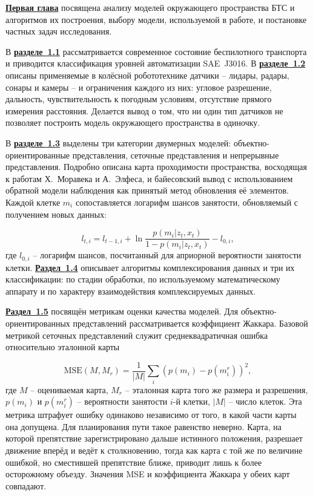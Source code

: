 \underline{\textbf{Первая глава}} посвящена анализу моделей окружающего пространства БТС и алгоритмов их построения, выбору модели, используемой в работе, и постановке частных задач исследования.

В \underline{\textbf{разделе~1.1}} рассматривается современное состояние беспилотного транспорта и приводится классификация уровней автоматизации SAE~J3016. В \underline{\textbf{разделе~1.2}} описаны применяемые в колёсной робототехнике датчики -- лидары, радары, сонары и камеры -- и ограничения каждого из них: угловое разрешение, дальность, чувствительность к погодным условиям, отсутствие прямого измерения расстояния. Делается вывод о том, что ни один тип датчиков не позволяет построить модель окружающего пространства в одиночку.

В \underline{\textbf{разделе~1.3}} выделены три категории двумерных моделей: объектно-ориентированные представления, сеточные представления и непрерывные представления. Подробно описана карта проходимости пространства, восходящая к работам Х.~Моравека и А.~Элфеса, и байесовский вывод с использованием обратной модели наблюдения как принятый метод обновления её элементов. Каждой клетке $m_i$ сопоставляется логарифм шансов занятости, обновляемый с получением новых данных:

\begin{equation}
	l_{t,i} = l_{t-1,i} + \ln\dfrac{p(m_i|z_t, x_t)}{1 - p(m_i|z_t, x_t)} - l_{0,i},
	\label{eq:syn_log_odd_upd}
\end{equation}
где $l_{0,i}$ -- логарифм шансов, посчитанный для априорной вероятности занятости клетки. \underline{\textbf{Раздел~1.4}} описывает алгоритмы комплексирования данных и три их классификации: по стадии обработки, по используемому математическому аппарату и по характеру взаимодействия комплексируемых данных.

\underline{\textbf{Раздел~1.5}} посвящён метрикам оценки качества моделей. Для объектно-ориентированных представлений рассматривается коэффициент Жаккара. Базовой метрикой сеточных представлений служит среднеквадратичная ошибка относительно эталонной карты

\begin{equation}
	\text{MSE}(M, M_r) = \dfrac{1}{|M|}\sum_{i}\left(p(m_i) - p(m_i^r)\right)^2,
	\label{eq:syn_map_mse}
\end{equation}
где $M$ -- оцениваемая карта, $M_r$ -- эталонная карта того же размера и разрешения, $p(m_i)$ и $p(m_i^r)$ -- вероятности занятости $i$-й клетки, $|M|$ -- число клеток. Эта метрика штрафует ошибку одинаково независимо от того, в какой части карты она допущена. Для планирования пути такое равенство неверно. Карта, на которой препятствие зарегистрировано дальше истинного положения, разрешает движение вперёд и ведёт к столкновению, тогда как карта с той же по величине ошибкой, но сместившей препятствие ближе, приводит лишь к более осторожному объезду. Значения MSE и коэффициента Жаккара у обеих карт совпадают.


